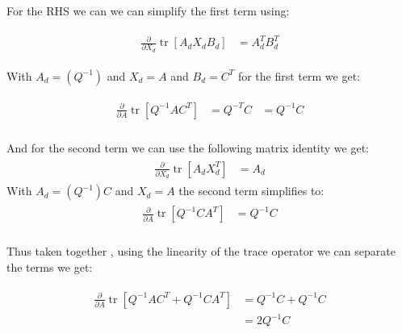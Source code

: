 \documentclass{tufte-handout}
\begin{document}
\begin{enumerate}[(a)]
    For the RHS we can we can simplify the first term using:  

    \begin{multline}
    \begin{aligned}     
        \frac{\partial}{\partial X_d} \operatorname{tr}\left[ A_d X_d B_d \right] &=  A_d^T B_d^T 
    \end{aligned}
    \end{multline}

    With $A_d = (Q^{-1})$ and $X_d = A$ and $B_d = C^T$ for the first term we get:
    
    \begin{multline}
        \begin{aligned}
            \frac{\partial}{\partial A} \operatorname{tr}\left[ Q^{-1}AC^T  \right] &=  Q^{-T}C &= Q^{-1}C \\
        \end{aligned} 
    \end{multline}
    
    And for the second term we can use the following matrix identity we get: 
    \begin{multline}
    \begin{aligned}     
        \frac{\partial}{\partial X_d} \operatorname{tr}\left[ A_d X_d^T \right] &= A_d
    \end{aligned}
    \end{multline}
    With $A_d = (Q^{-1})C$ and $X_d = A$ the second term simplifies to:  
    \begin{multline}
        \begin{aligned}
            \frac{\partial}{\partial A} \operatorname{tr}\left[ Q^{-1}CA^T  \right] &=  Q^{-1}C \\
        \end{aligned} 
    \end{multline}
   
    Thus taken together , using the linearity of the trace operator  we can separate the terms we get: 
    
    \begin{multline}
        \begin{aligned}
            \frac{\partial}{\partial A} \operatorname{tr}\left[ Q^{-1}AC^T  + Q^{-1}CA^T  \right] &= Q^{-1}C + Q^{-1}C \\
            &= 2 Q^{-1}C \\    
        \end{aligned}
    \end{multline}


\end{enumerate}
\end{document}
